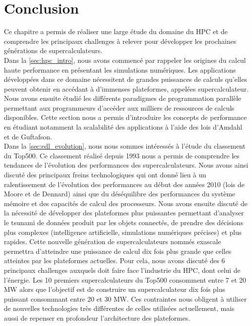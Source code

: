 \section{Conclusion}\label{sec:conclusion-hpc}


    Ce chapitre a permis de réaliser une large étude du domaine du HPC et de comprendre les principaux challenges à relever pour développer les prochaines générations de supercalculateurs.\\
    
    
    Dans la \autoref{sec:hpc_intro}, nous avons commencé par rappeler les origines du calcul haute performance en présentant les simulations numériques. Les applications développées dans ce domaine nécessitent de grandes puissances de calculs qu'elles peuvent obtenir en accédant à d'immenses plateformes, appelées supercalculateur. Nous avons ensuite étudié les différents paradigmes de programmation parallèle permettant aux programmeurs d'accéder aux milliers de ressources de calculs disponibles. Cette section nous a permis d'introduire les concepts de performance en étudiant notamment la scalabilité des applications à l'aide des lois d'Amdahl et de Guftafson.\\
    
    
    Dans la \autoref{sec:edl_evolution}, nous nous sommes intéressés à l'étude du classement du Top500. Ce classement réalisé depuis 1993 nous a permis de comprendre les tendances de l'évolution des performances des supercalculateurs. Nous avons ainsi discuté des principaux freins technologiques qui ont donné lieu à un ralentissement de l'évolution des performances au début des années 2010 (lois de Moore et de Dennard) ainsi que du déséquilibre des performances du système mémoire et des capacités de calcul des processeurs. Nous avons ensuite discuté de la nécessité de développer des plateformes plus puissantes permettant d'analyser le tsunami de données produit par les objets connectés, de prendre des décisions plus complexes (intelligence artificielle, simulations numériques précises) et plus rapides. Cette nouvelle génération de supercalculateurs nommés exascale permettra d'atteindre une puissance de calcul dix fois plus grande que celles atteintes par les plateformes actuelles. Pour cela, nous avons discuté des 6 principaux challenges auxquels doit faire face l'industrie du HPC, dont celui de l’énergie. Les 10 premiers supercalculateurs du Top500 consomment entre 7 et 20 MW alors que l’objectif est de construire un supercalculateur dix fois plus puissant consommant entre 20 et 30 MW. Ces contraintes nous obligent à utiliser de nouvelles technologies très différentes de celles utilisées actuellement, mais aussi de repenser en profondeur l'architecture des plateformes.\\
    
